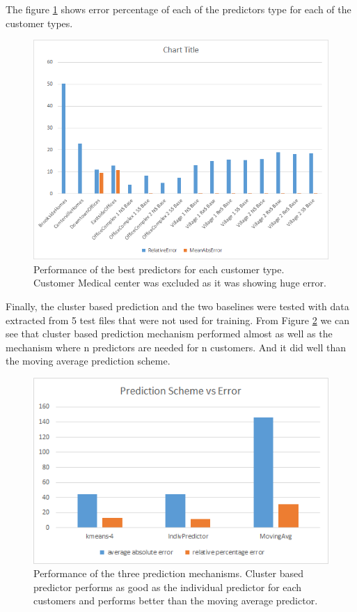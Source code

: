 The figure \ref{fig:indiv-cutomer-best-predictor-error} shows error percentage of each of the predictors type for each of the customer types.

\begin{figure}[h!]
  \includegraphics[width=\linewidth]{indiv-cutomer-best-predictor-error.png}
  \caption{Performance of the best predictors for each customer type. Customer Medical center was excluded as it was showing huge error. }
  \label{fig:indiv-cutomer-best-predictor-error}
\end{figure}

Finally, the cluster based prediction and the two baselines were tested with data extracted from 5 test files that were not used for training. From Figure \ref{fig:prediction-scheme-vs-error} we can see that cluster based prediction mechanism performed almost as well as the mechanism where n predictors are needed for n customers. And it did well than the moving average prediction scheme.

\begin{figure}[h!]
  \includegraphics[width=\linewidth]{prediction-scheme-vs-error.png}
  \caption{Performance of the three prediction mechanisms. Cluster based predictor performs as good as the individual predictor for each customers and performs better than the moving average predictor. }
  \label{fig:prediction-scheme-vs-error}
\end{figure}